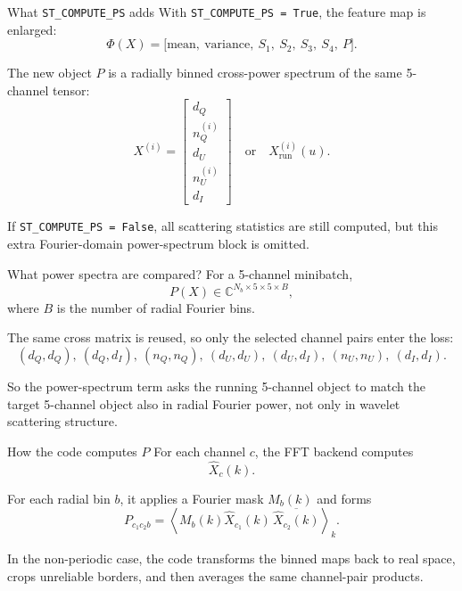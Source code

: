\documentclass[aspectratio=169,11pt]{beamer}
\begin{document}
\begin{frame}[fragile]{What \texttt{ST\_COMPUTE\_PS} adds}
With \texttt{ST\_COMPUTE\_PS = True}, the feature map is enlarged:
\[
  \Phi(X)=
  \Big[
    \text{mean},\ \text{variance},\ S_1,\ S_2,\ S_3,\ S_4,\ P
  \Big].
\]

\vspace{0.25em}
The new object $P$ is a radially binned cross-power spectrum of the same
5-channel tensor:
\[
  X^{(i)}=
  \begin{bmatrix}
    d_Q\\ n_Q^{(i)}\\ d_U\\ n_U^{(i)}\\ d_I
  \end{bmatrix}
  \quad\text{or}\quad
  X_{\mathrm{run}}^{(i)}(u).
\]

\vspace{0.25em}
If \texttt{ST\_COMPUTE\_PS = False}, all scattering statistics are still computed,
but this extra Fourier-domain power-spectrum block is omitted.
\end{frame}

\begin{frame}[fragile]{What power spectra are compared?}
For a 5-channel minibatch,
\[
  P(X)\in\mathbb{C}^{N_b\times5\times5\times B},
\]
where $B$ is the number of radial Fourier bins.

\vspace{0.25em}
The same cross matrix is reused, so only the selected channel pairs enter the
loss:
\[
  (d_Q,d_Q),\ (d_Q,d_I),\ (n_Q,n_Q),\ (d_U,d_U),\ (d_U,d_I),\ (n_U,n_U),\ (d_I,d_I).
\]

\vspace{0.25em}
So the power-spectrum term asks the running 5-channel object to match the
target 5-channel object also in radial Fourier power, not only in wavelet
scattering structure.
\end{frame}

\begin{frame}[fragile]{How the code computes $P$}
For each channel $c$, the FFT backend computes
\[
  \widehat X_c(k).
\]

\vspace{0.25em}
For each radial bin $b$, it applies a Fourier mask $M_b(k)$ and forms
\[
  P_{c_1c_2b}
  =
  \left\langle
    M_b(k)\widehat X_{c_1}(k)\,
    \overline{\widehat X_{c_2}(k)}
  \right\rangle_k.
\]

\vspace{0.25em}
In the non-periodic case, the code transforms the binned maps back to real
space, crops unreliable borders, and then averages the same channel-pair
products.
\end{frame}
\end{document}
